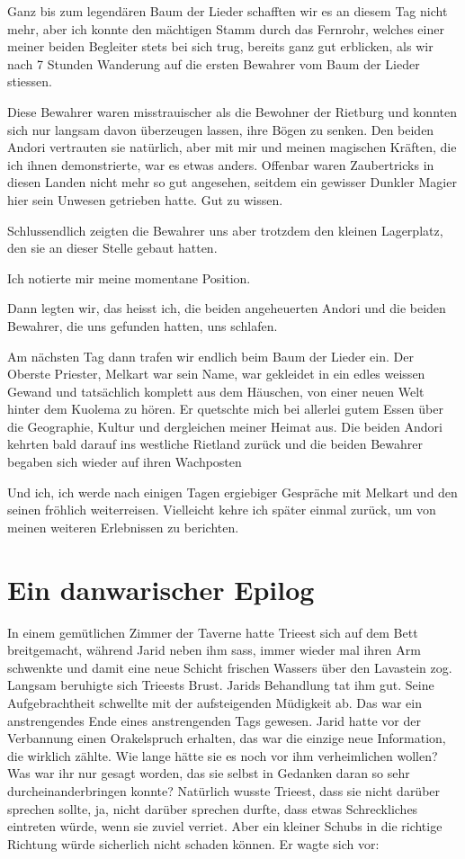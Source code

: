 Ganz bis zum legendären Baum der Lieder schafften wir es an diesem Tag nicht mehr, aber ich konnte den mächtigen Stamm durch das Fernrohr, welches einer meiner beiden Begleiter stets bei sich trug, bereits ganz gut erblicken, als wir nach 7 Stunden Wanderung auf die ersten Bewahrer vom Baum der Lieder stiessen.

Diese Bewahrer waren misstrauischer als die Bewohner der Rietburg und konnten sich nur langsam davon überzeugen lassen, ihre Bögen zu senken. Den beiden Andori vertrauten sie natürlich, aber mit mir und meinen magischen Kräften, die ich ihnen demonstrierte, war es etwas anders. Offenbar waren Zaubertricks in diesen Landen nicht mehr so gut angesehen, seitdem ein gewisser Dunkler Magier hier sein Unwesen getrieben hatte. Gut zu wissen.

Schlussendlich zeigten die Bewahrer uns aber trotzdem den kleinen Lagerplatz, den sie an dieser Stelle gebaut hatten.

Ich notierte mir meine momentane Position.\bigskip



Dann legten wir, das heisst ich, die beiden angeheuerten Andori und die beiden Bewahrer, die uns gefunden hatten, uns schlafen.

Am nächsten Tag dann trafen wir endlich beim Baum der Lieder ein. Der Oberste Priester, Melkart war sein Name, war gekleidet in ein edles weissen Gewand und tatsächlich komplett aus dem Häuschen, von einer neuen Welt hinter dem Kuolema zu hören. Er quetschte mich bei allerlei gutem Essen über die Geographie, Kultur und dergleichen meiner Heimat aus. Die beiden Andori kehrten bald darauf ins westliche Rietland zurück und die beiden Bewahrer begaben sich wieder auf ihren Wachposten

Und ich, ich werde nach einigen Tagen ergiebiger Gespräche mit Melkart und den seinen fröhlich weiterreisen. Vielleicht kehre ich später einmal zurück, um von meinen weiteren Erlebnissen zu berichten.




\newpage
\section{Ein danwarischer Epilog}

In einem gemütlichen Zimmer der Taverne hatte Trieest sich auf dem Bett breitgemacht, während Jarid neben ihm sass, immer wieder mal ihren Arm schwenkte und damit eine neue Schicht frischen Wassers über den Lavastein zog. Langsam beruhigte sich Trieests Brust. Jarids Behandlung tat ihm gut. Seine Aufgebrachtheit schwellte mit der aufsteigenden Müdigkeit ab. Das war ein anstrengendes Ende eines anstrengenden Tags gewesen. Jarid hatte vor der Verbannung einen Orakelspruch erhalten, das war die einzige neue Information, die wirklich zählte. Wie lange hätte sie es noch vor ihm verheimlichen wollen? Was war ihr nur gesagt worden, das sie selbst in Gedanken daran so sehr durcheinanderbringen konnte? Natürlich wusste Trieest, dass sie nicht darüber sprechen sollte, ja, nicht darüber sprechen durfte, dass etwas Schreckliches eintreten würde, wenn sie zuviel verriet. Aber ein kleiner Schubs in die richtige Richtung würde sicherlich nicht schaden können. Er wagte sich vor:

